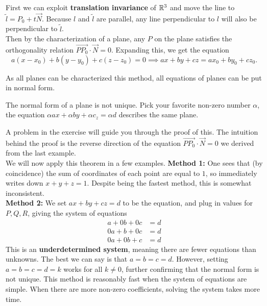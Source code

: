 First we can exploit \textbf{translation invariance} of $\mathbb{R}^3$ and move the line to $\tilde{l}=P_0 + t\vec{N}$. Because $l$ and $\tilde{l}$ are parallel, any line perpendicular to $l$ will also be perpendicular to $\tilde{l}$.\\
Then by the characterization of a plane, any $P$ on the plane satisfies the orthogonality relation $\overrightarrow{PP_0}\cdot\vec{N}=0$. Expanding this, we get the equation \[
a(x-x_0)+b(y-y_0)+c(z-z_0)=0 \implies ax+by+cz=ax_0+by_0+cz_0.
\]
\begin{remark}
	As all planes can be characterized this method, all equations of planes can be put in normal form.
\end{remark}
\begin{remark}
	The normal form of a plane is not unique. Pick your favorite non-zero number $\alpha$, the equation $\alpha ax+\alpha by+\alpha c_z=\alpha d$ describes the same plane.
\end{remark}
A problem in the exercise will guide you through the proof of this. The intuition behind the proof is the reverse direction of the equation $\overrightarrow{PP_0}\cdot\vec{N}=0$ we derived from the last example.\\
We will now apply this theorem in a few examples.
\textbf{Method 1:} One sees that (by coincidence) the sum of coordinates of each point are equal to $1$, so immediately writes down $x+y+z=1$. Despite being the fastest method, this is somewhat inconsistent.\\


\textbf{Method 2:} We set $ax+by+cz=d$ to be the equation, and plug in values for $P,Q,R$, giving the system of equations\begin{align*}
	a+0b+0c&=d \\ 0a+b+0c&=d \\ 0a+0b+c&=d 
\end{align*}
This is an \textbf{underdetermined system}, meaning there are fewer equations than unknowns. The best we can say is that $a=b=c=d$. However, setting $a=b=c=d=k$ works for all $k\neq 0$, further confirming that the normal form is not unique. This method is reasonably fast when the system of equations are simple. When there are more non-zero coefficients, solving the system takes more time.\\

